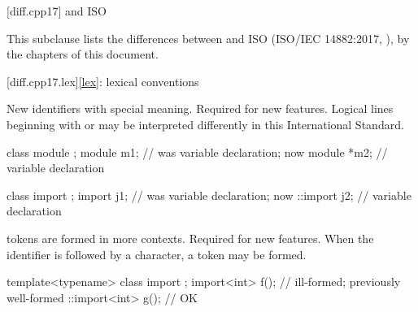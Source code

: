 

%

[diff.cpp17]{\Cpp{} and ISO \CppXVII{}}

\pnum
{}%
This subclause lists the differences between \Cpp{} and
ISO \CppXVII{} (ISO/IEC 14882:2017, ),
by the chapters of this document.

[diff.cpp17.lex]{\ref{lex}: lexical conventions}

\change
New identifiers with special meaning.
\rationale
Required for new features.
\effect
Logical lines beginning with
 or  may
be interpreted differently
in this International Standard.
\begin{example}
\begin{codeblock}
class module {};
module m1;          // was variable declaration; now 
module *m2;         // variable declaration

class import {};
import j1;          // was variable declaration; now 
::import j2;        // variable declaration
\end{codeblock}
\end{example}

\change
{} tokens are formed in more contexts.
\rationale
Required for new features.
\effect
When the identifier 
is followed by a \tcode{<} character,
a  token may be formed.
\begin{example}
\begin{codeblock}
template<typename> class import {};
import<int> f();                // ill-formed; previously well-formed
::import<int> g();              // OK
\end{codeblock}
\end{example}

